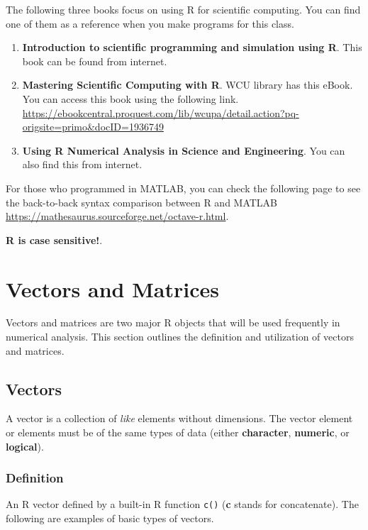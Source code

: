 \documentclass[
]{book}
\begin{document}
The following three books focus on using R for scientific computing. You can find one of them as a reference when you make programs for this class.

\begin{enumerate}
\def\labelenumi{\arabic{enumi}.}
\item
  \textbf{Introduction to scientific programming and simulation using R}. This book can be found from internet.
\item
  \textbf{Mastering Scientific Computing with R}. WCU library has this eBook. You can access this book using the following link. \url{https://ebookcentral.proquest.com/lib/wcupa/detail.action?pq-origsite=primo\&docID=1936749}
\item
  \textbf{Using R Numerical Analysis in Science and Engineering}. You can also find this from internet.
\end{enumerate}

For those who programmed in MATLAB, you can check the following page to see the back-to-back syntax comparison between R and MATLAB \url{https://mathesaurus.sourceforge.net/octave-r.html}.

\textbf{\color{red} R is case sensitive!}.

\hypertarget{vectors-and-matrices}{%
\section{Vectors and Matrices}\label{vectors-and-matrices}}

Vectors and matrices are two major R objects that will be used frequently in numerical analysis. This section outlines the definition and utilization of vectors and matrices.

\hypertarget{vectors}{%
\subsection{Vectors}\label{vectors}}

A vector is a collection of \emph{like} elements without dimensions. The vector element or elements must be of the same types of data (either \textbf{character}, \textbf{numeric}, or \textbf{logical}).

\hypertarget{definition-1}{%
\subsubsection{Definition}\label{definition-1}}

An R vector defined by a built-in R function \texttt{c()} (\textbf{c} stands for concatenate). The following are examples of basic types of vectors.
\end{document}
